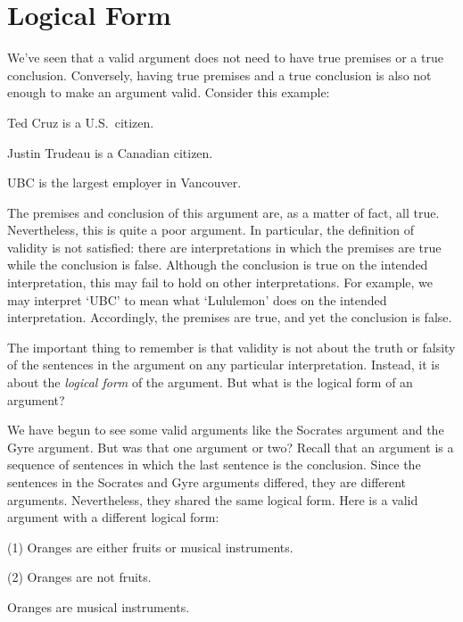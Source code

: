 \section{Logical Form}
\label{sec:LogicalForm}

We've seen that a valid argument does not need to have true premises or a true conclusion.
Conversely, having true premises and a true conclusion is also not enough to make an argument valid.
Consider this example:

\begin{earg}
  \item[] Ted Cruz is a U.S.\ citizen.
  \item[] Justin Trudeau is a Canadian citizen.
  \item[\therefore] UBC is the largest employer in Vancouver.
\end{earg}

The premises and conclusion of this argument are, as a matter of fact, all true.
Nevertheless, this is quite a poor argument.
In particular, the definition of validity is not satisfied: there are interpretations in which the premises are true while the conclusion is false.
Although the conclusion is true on the intended interpretation, this may fail to hold on other interpretations.
For example, we may interpret `UBC' to mean what `Lululemon' does on the intended interpretation.
Accordingly, the premises are true, and yet the conclusion is false.

The important thing to remember is that validity is not about the truth or falsity of the sentences in the argument on any particular interpretation. 
Instead, it is about the \textit{logical form} of the argument.
But what is the logical form of an argument?

We have begun to see some valid arguments like the Socrates argument and the Gyre argument.
But was that one argument or two?
Recall that an argument is a sequence of sentences in which the last sentence is the conclusion.
Since the sentences in the Socrates and Gyre arguments differed, they are different arguments.
Nevertheless, they shared the same logical form.
Here is a valid argument with a different logical form:

\begin{earg}
  \item[(1)] Oranges are either fruits or musical instruments.
  \item[(2)] Oranges are not fruits.
  \item[\therefore] Oranges are musical instruments.
\end{earg}

